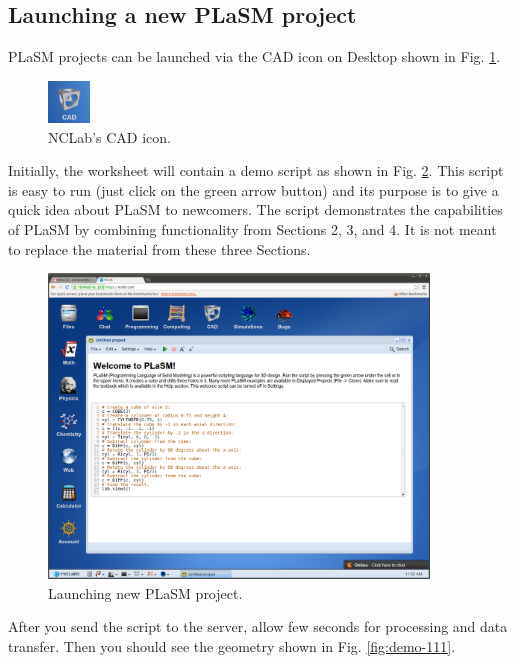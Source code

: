 \subsection{Launching a new PLaSM project}


PLaSM projects can be launched via the CAD icon on Desktop shown in
Fig. \ref{fig:cadicon}.

\begin{figure}[!ht]
\begin{center}
\includegraphics[width=0.1\textwidth]{img/cadicon.png}
\end{center}
\vspace{-2mm}
\caption{NCLab's CAD icon.}
\vspace{-1cm}
\label{fig:cadicon}
\end{figure}
\newpage
\noindent
Initially, the worksheet will contain a demo script
as shown in Fig. \ref{fig:python}. This script is easy to run 
(just click on the green arrow button) and its purpose is to 
give a quick idea about PLaSM to newcomers. The script 
demonstrates the capabilities of PLaSM by combining
functionality from Sections 2, 3, and 4. It is not meant to 
replace the material from these three Sections.


\begin{figure}[!ht]
\begin{center}
\includegraphics[width=0.9\textwidth]{img/python.png}
\end{center}
\vspace{-2mm}
\caption{Launching new PLaSM project.}
\label{fig:python}
\end{figure}
\noindent
After you send the script to the server, allow few seconds 
for processing and data transfer. Then you should see the geometry 
shown in Fig. \ref{fig:demo-111}.
\newpage
 
